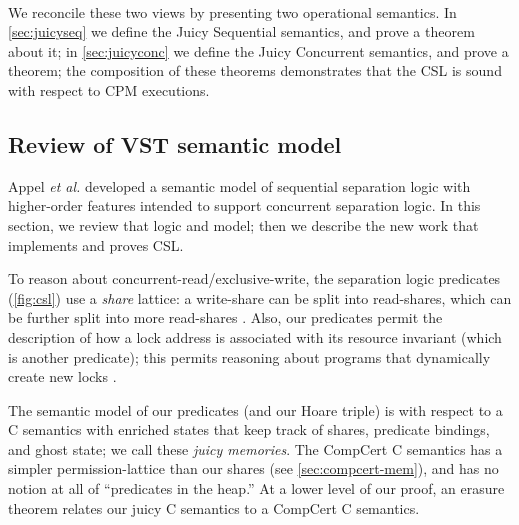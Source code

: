 \

We reconcile these two views by presenting two
operational semantics. In \autoref{sec:juicyseq}
we define the Juicy Sequential semantics, and prove a theorem about it;
in \autoref{sec:juicyconc} we define the Juicy Concurrent semantics, and prove a theorem;
the composition of these theorems demonstrates that
the CSL is sound with respect to CPM executions.

\subsection{Review of VST semantic model}
\label{subsec:vst-review}
Appel \emph{et al.} \cite{appel14:plcc} developed a semantic model of sequential separation logic
with higher-order features intended to support concurrent separation logic.
In this section, we review that logic and model;
then we describe the new work that implements and proves CSL.

To reason about concurrent-read/exclusive-write,
the separation logic predicates (\autoref{fig:csl}) use a
\emph{share} lattice: a write-share can be split into read-shares,
which can be further split into more read-shares
\cite[Chapters 11,41]{appel14:plcc}.
Also, our predicates permit the description
of how a lock address is associated with its resource invariant
(which is another predicate); this permits reasoning about
programs that dynamically create new locks \cite[Chapter 30]{appel14:plcc}.

The semantic model of our predicates (and our Hoare triple) is
with respect to a C semantics with enriched states that keep
track of shares, predicate bindings, and ghost state; we call these
\emph{juicy memories}.  The CompCert C semantics
has a simpler permission-lattice than our shares
(see \autoref{sec:compcert-mem}), and has no notion at all
of ``predicates in the heap.''  
At a lower level of our proof, 
an erasure theorem relates our juicy C semantics to a
CompCert C semantics.


